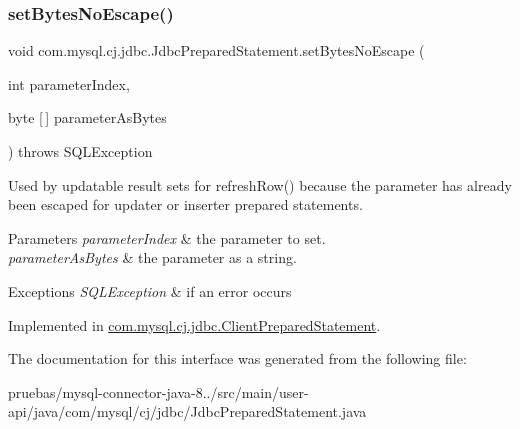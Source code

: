 \subsubsection{\texorpdfstring{set\+Bytes\+No\+Escape()}{setBytesNoEscape()}}
{\footnotesize\ttfamily void com.\+mysql.\+cj.\+jdbc.\+Jdbc\+Prepared\+Statement.\+set\+Bytes\+No\+Escape (\begin{DoxyParamCaption}\item[{int}]{parameter\+Index,  }\item[{byte \mbox{[}$\,$\mbox{]}}]{parameter\+As\+Bytes }\end{DoxyParamCaption}) throws S\+Q\+L\+Exception}

Used by updatable result sets for refresh\+Row() because the parameter has already been escaped for updater or inserter prepared statements.


\begin{DoxyParams}{Parameters}
{\em parameter\+Index} & the parameter to set. \\
\hline
{\em parameter\+As\+Bytes} & the parameter as a string.\\
\hline
\end{DoxyParams}

\begin{DoxyExceptions}{Exceptions}
{\em S\+Q\+L\+Exception} & if an error occurs \\
\hline
\end{DoxyExceptions}


Implemented in \mbox{\hyperlink{classcom_1_1mysql_1_1cj_1_1jdbc_1_1_client_prepared_statement_a7db4bf1c51418004ea1482b72d2c7913}{com.\+mysql.\+cj.\+jdbc.\+Client\+Prepared\+Statement}}.



The documentation for this interface was generated from the following file\+:\begin{DoxyCompactItemize}
\item 
pruebas/mysql-\/connector-\/java-\/8../src/main/user-\/api/java/com/mysql/cj/jdbc/Jdbc\+Prepared\+Statement.\+java\end{DoxyCompactItemize}
